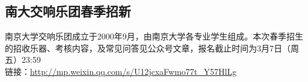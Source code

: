 \documentclass[letterpaper, 12pt]{article}
\begin{document}
\begin{multicols}{2}
\section{南大交响乐团春季招新}
南京大学交响乐团成立于2000年9月，由南京大学各专业学生组成。本次春季招生的招收乐器、考核内容，及常见问答见公众号文章，报名截止时间为3月7日（周五）23:59\\
链接：\url{http://mp.weixin.qq.com/s/U12jcxaFwmo77t_Y57HlLg}\\

\end{multicols} 
\end{document}
